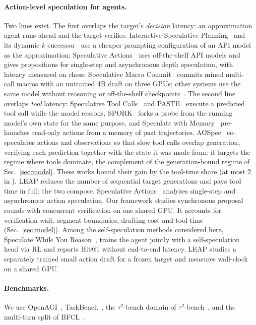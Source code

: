 \paragraph{Action-level speculation for agents.}
Two lines exist. The first overlaps the target's \emph{decision} latency: an approximation agent runs
ahead and the target verifies. Interactive Speculative Planning~\citep{isp} and its dynamic-$k$
successor~\citep{dsp} use a cheaper prompting configuration of an API model as the approximation;
Speculative Actions~\citep{specactions} uses off-the-shelf API models and gives propositions for
single-step and asynchronous depth speculation, with latency measured on chess; Speculative Macro
Commit~\citep{smc} commits mined multi-call macros with an untrained 4B draft on three GPUs; other
systems use the same model without reasoning or off-the-shelf checkpoints~\citep{spagent,dualspec}. The second
line overlaps \emph{tool} latency: Speculative Tool Calls~\citep{stc} and PASTE~\citep{paste} execute a
predicted tool call while the model reasons, SPORK~\citep{spork} forks a probe from the running model's
own state for the same purpose, and Speculate with Memory~\citep{swm} pre-launches read-only actions from
a memory of past trajectories. AOSpec~\citep{aospec} co-speculates actions and observations so that slow
tool calls overlap generation, verifying each prediction together with the state it was made from; it
targets the regime where tools dominate, the complement of the generation-bound regime of
Sec.~\ref{sec:model}. These works bound their gain by the tool-time share (at most 2\xx{} in
\citet{stc}). LEAP reduces the number of sequential target generations and pays tool time in
full; the two compose. Speculative Actions~\citep{specactions} analyzes single-step and asynchronous
action speculation. Our framework studies synchronous proposal rounds with concurrent verification
on one shared GPU. It accounts for verification wait, segment boundaries, drafting cost and tool time
(Sec.~\ref{sec:model}). Among the self-speculation methods considered here, Speculate While You Reason~\citep{swyr},
trains the agent jointly with a self-speculation head via RL and reports Hit@1 without end-to-end
latency. LEAP studies a separately trained small action draft for a frozen target and measures wall-clock on a shared GPU.

\paragraph{Benchmarks.}
We use OpenAGI~\citep{openagi}, TaskBench~\citep{taskbench}, the $\tau^2$-bench domain of
$\tau^2$-bench~\citep{tau2bench}, and the multi-turn split of BFCL~\citep{bfcl}.

